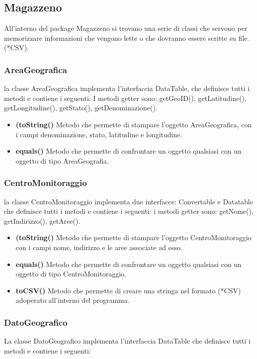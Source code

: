 \documentclass[a4paper, 12pt,twoside]{article}
\begin{document}
		
		\subsection{Magazzeno}
		All'interno del package Magazzeno si trovano una serie di classi che servono per memorizzare informazioni che vengono lette o che dovranno essere scritte su file.(*CSV).
		
			\subsubsection{AreaGeografica}
			la classe AreaGeografica implementa l'interfaccia DataTable, che definisce tutti i metodi e contiene i seguenti:
			I metodi getter sono: getGeoID(), getLatitudine(), getLongitudine(), getStato(), getDenominazione().  
			\begin{itemize}
				\item \textbf{(toString()}
				Metodo che permette di stampare l'oggetto AreaGeografica, con i campi denominazione, stato, latitudine e longitudine.
				\item \textbf{equals()}
				Metodo che permette di confrontare un oggetto qualsiasi con un oggetto di tipo AreaGeografia. 
			\end{itemize}
			
			\subsubsection{CentroMonitoraggio}
			la classe CentroMonitoraggio implementa due interfacce: Convertable e Datatable che definisce tutti i metodi e contiene i seguenti:
			i metodi getter sono: getNome(), getIndirizzo(), getAree().
			\begin{itemize}
				\item \textbf{(toString()}
				Metodo che permette di stampare l'oggetto CentroMonitoraggio con i campi nome, indirizzo e le aree associate ad esso.
				\item \textbf{equals()}
				Metodo che permette di confrontare un oggetto qualsiasi con un oggetto di tipo CentroMonitoraggio.
				\item \textbf{toCSV()}
				Metodo che permette di creare una stringa nel formato (*CSV) adoperato all'interno del programma.
			\end{itemize}
			
			\subsubsection{DatoGeografico}
			La classe DatoGeografico implementa l'interfaccia DataTable che definisce tutti i metodi e contiene i seguenti:
%			
\end{document}
